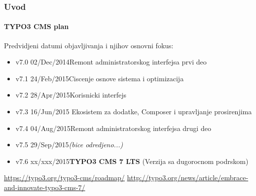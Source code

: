 \begin{frame}[fragile]
	\frametitle{Uvod}
	\framesubtitle{TYPO3 CMS plan}

	Predvidjeni datumi objavljivanja i njihov osnovni fokus:

	\begin{itemize}
		\item v7.0 \tabto{1.0cm}02/Dec/2014\tabto{3.4cm}Remont administratorskog interfejsa prvi deo
		\item v7.1 \tabto{1.0cm}24/Feb/2015\tabto{3.4cm}Ciscenje osnove sistema i optimizacija
		\item v7.2 \tabto{1.0cm}28/Apr/2015\tabto{3.4cm}Korisnicki interfejs
		\item v7.3 \tabto{1.0cm}16/Jun/2015\tabto{3.4cm} Ekosistem za dodatke, Composer\newline
			\tabto{3.4cm} i upravljanje prosirenjima
		\item
			\begingroup
				\color{typo3orange}
					v7.4 \tabto{1.0cm}04/Aug/2015\tabto{3.4cm}Remont administratorskog interfejsa drugi deo
			\endgroup

		\item v7.5 \tabto{1.0cm}29/Sep/2015\tabto{3.4cm}\textit{(bice odredjeno...)}
		\item v7.6 \tabto{1.0cm}xx/xxx/2015\tabto{3.4cm}\textbf{TYPO3 CMS 7 LTS}\newline
			\tabto{3.4cm}(Verzija sa dugorocnom podrskom)
	\end{itemize}

	\smaller
		\url{https://typo3.org/typo3-cms/roadmap/}\newline
		\url{http://typo3.org/news/article/embrace-and-innovate-typo3-cms-7/}
	\normalsize

\end{frame}

